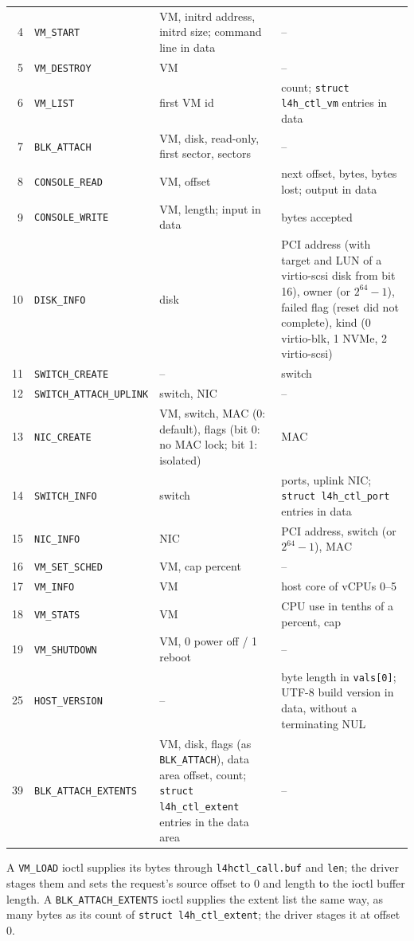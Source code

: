 \documentclass[11pt,a4paper]{report}
\begin{document}
\begin{longtable}{@{}r>{\raggedright\arraybackslash}p{3.6cm}>{\raggedright\arraybackslash}p{4.6cm}>{\raggedright\arraybackslash}p{4.7cm}@{}}
4 & \texttt{VM\_START} & VM, initrd address, initrd size; command line
  in data & -- \\
5 & \texttt{VM\_DESTROY} & VM & -- \\
6 & \texttt{VM\_LIST} & first VM id & count; \texttt{struct l4h\_ctl\_vm}
  entries in data \\
7 & \texttt{BLK\_ATTACH} & VM, disk, read-only, first sector, sectors & -- \\
8 & \texttt{CONSOLE\_READ} & VM, offset & next offset, bytes, bytes lost;
  output in data \\
9 & \texttt{CONSOLE\_WRITE} & VM, length; input in data & bytes accepted \\
10 & \texttt{DISK\_INFO} & disk & PCI address (with target and LUN of a
  virtio-scsi disk from bit 16), owner (or $2^{64}-1$), failed
  flag (reset did not complete),
  kind (0 virtio-blk, 1 NVMe, 2 virtio-scsi) \\
11 & \texttt{SWITCH\_CREATE} & -- & switch \\
12 & \texttt{SWITCH\_ATTACH\_\allowbreak UPLINK} & switch, NIC & -- \\
13 & \texttt{NIC\_CREATE} & VM, switch, MAC (0: default), flags (bit 0:
  no MAC lock; bit 1: isolated) & MAC \\
14 & \texttt{SWITCH\_INFO} & switch & ports, uplink NIC; \texttt{struct
  l4h\_ctl\_port} entries in data \\
15 & \texttt{NIC\_INFO} & NIC & PCI address, switch (or $2^{64}-1$), MAC \\
16 & \texttt{VM\_SET\_SCHED} & VM, cap percent & -- \\
17 & \texttt{VM\_INFO} & VM & host core of vCPUs 0--5 \\
18 & \texttt{VM\_STATS} & VM & CPU use in tenths of a percent, cap \\
19 & \texttt{VM\_SHUTDOWN} & VM, 0 power off / 1 reboot & -- \\
25 & \texttt{HOST\_VERSION} & -- & byte length in \texttt{vals[0]}; UTF-8
  build version in data, without a terminating NUL \\
39 & \texttt{BLK\_ATTACH\_\allowbreak EXTENTS} & VM, disk, flags (as
  \texttt{BLK\_ATTACH}), data area offset, count; \texttt{struct
  l4h\_ctl\_extent} entries in the data area & -- \\
\bottomrule
\end{longtable}

A \texttt{VM\_LOAD} ioctl supplies its bytes through
\texttt{l4hctl\_call.buf} and \texttt{len}; the driver stages them and sets
the request's source offset to 0 and length to the ioctl buffer length.
A \texttt{BLK\_ATTACH\_EXTENTS} ioctl supplies the extent list the same
way, as many bytes as its count of \texttt{struct l4h\_ctl\_extent}; the
driver stages it at offset 0.
\end{document}
